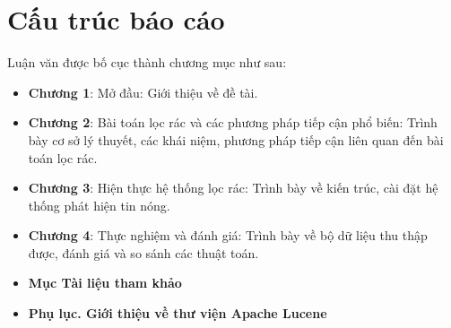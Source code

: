 \section{Cấu trúc báo cáo}
Luận văn được bố cục thành chương mục như sau:
\begin{itemize}
	\item \textbf{Chương 1}: Mở đầu: Giới thiệu về đề tài.
	\item \textbf{Chương 2}: Bài toán lọc rác và các phương pháp tiếp cận phổ biến: Trình bày cơ sở lý thuyết, các khái niệm, phương pháp tiếp cận liên quan đến bài toán lọc rác.
	\item \textbf{Chương 3}: Hiện thực hệ thống lọc rác: Trình bày về kiến trúc, cài đặt hệ thống phát hiện tin nóng.
	\item \textbf{Chương 4}: Thực nghiệm và đánh giá: Trình bày về bộ dữ liệu thu thập được, đánh giá và so sánh các thuật toán.
	\item \textbf{Mục Tài liệu tham khảo}
	\item \textbf{Phụ lục. Giới thiệu về thư viện Apache Lucene}
\end{itemize}
